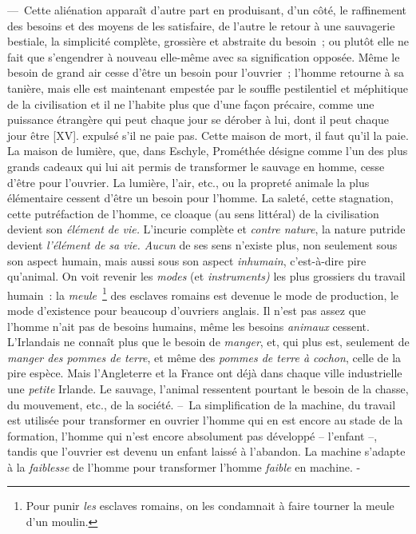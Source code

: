\documentclass[french,twoside]{book} %
\begin{document}
— Cette aliénation apparaît d’autre part en produisant, d’un côté, le raffinement des besoins et des moyens de les satisfaire, de l’autre le retour à une sauvagerie bestiale, la simplicité complète, grossière et abstraite du besoin ; ou plutôt elle ne fait que s’engendrer à nouveau elle-même avec sa signification opposée. Même le besoin de grand air cesse d’être un besoin pour l’ouvrier ; l’homme retourne à sa tanière, mais elle est maintenant empestée par le souffle pestilentiel et méphitique de la civilisation et il ne l’habite plus que d’une façon précaire, comme une puissance étrangère qui peut chaque jour se dérober à lui, dont il peut chaque jour être [XV]. expulsé s’il ne paie pas. Cette maison de mort, il faut qu’il la paie. La maison de lumière, que, dans Eschyle, Prométhée désigne comme l’un des plus grands cadeaux qui lui ait permis de transformer le sauvage en homme, cesse d’être pour l’ouvrier. La lumière, l’air, etc., ou la propreté animale la plus élémentaire cessent d’être un besoin pour l’homme. La saleté, cette stagnation, cette putréfaction de l’homme, ce cloaque (au sens littéral) de la civilisation devient son \emph{élément de vie.} L’incurie complète et \emph{contre nature}, la nature putride devient \emph{l’élément de sa vie. Aucun} de ses sens n’existe plus, non seulement sous son aspect humain, mais aussi sous son aspect \emph{inhumain}, c’est-à-dire pire qu’animal. On voit revenir les \emph{modes} (et \emph{instruments)} les plus grossiers du travail humain : la \emph{meule} \footnote{Pour punir \emph{les} esclaves romains, on les condamnait à faire tourner la meule d’un moulin.} des esclaves romains est devenue le mode de production, le mode d’existence pour beaucoup d’ouvriers anglais. Il n’est pas assez que l’homme n’ait pas de besoins humains, même les besoins \emph{animaux} cessent. L’Irlandais ne connaît plus que le besoin de \emph{manger}, et, qui plus est, seulement de \emph{manger des pommes de terre}, et même des \emph{pommes de terre à cochon}, celle de la pire espèce. Mais l’Angleterre et la France ont déjà dans chaque ville industrielle une \emph{petite} Irlande. Le sauvage, l’animal ressentent pourtant le besoin de la chasse, du mouvement, etc., de la société. – La simplification de la machine, du travail est utilisée pour transformer en ouvrier l’homme qui en est encore au stade de la formation, l’homme qui n’est encore absolument pas développé – l’enfant –, tandis que l’ouvrier est devenu un enfant laissé à l’abandon. La machine s’adapte à la \emph{faiblesse} de l’homme pour transformer l’homme \emph{faible} en machine. -\par
\end{document}
